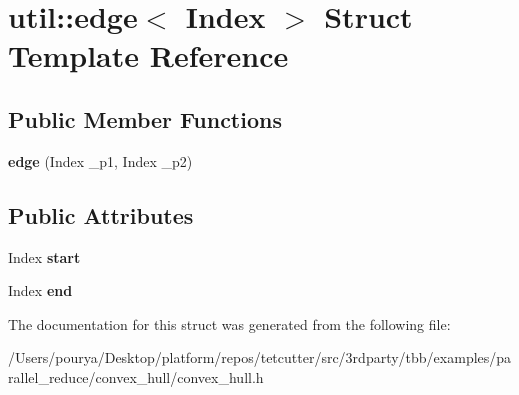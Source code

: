 \hypertarget{structutil_1_1edge}{}\section{util\+:\+:edge$<$ Index $>$ Struct Template Reference}
\label{structutil_1_1edge}
\subsection*{Public Member Functions}
\begin{DoxyCompactItemize}
\item 
\hypertarget{structutil_1_1edge_adda44d322aa2f8cf84fca30a4dc3a08e}{}{\bfseries edge} (Index \+\_\+p1, Index \+\_\+p2)\label{structutil_1_1edge_adda44d322aa2f8cf84fca30a4dc3a08e}

\end{DoxyCompactItemize}
\subsection*{Public Attributes}
\begin{DoxyCompactItemize}
\item 
\hypertarget{structutil_1_1edge_a16eddb9facb5669b55e4021ad0fd2f95}{}Index {\bfseries start}\label{structutil_1_1edge_a16eddb9facb5669b55e4021ad0fd2f95}

\item 
\hypertarget{structutil_1_1edge_afa367e9cc596c9f0277f57cc7dd103cd}{}Index {\bfseries end}\label{structutil_1_1edge_afa367e9cc596c9f0277f57cc7dd103cd}

\end{DoxyCompactItemize}


The documentation for this struct was generated from the following file\+:\begin{DoxyCompactItemize}
\item 
/\+Users/pourya/\+Desktop/platform/repos/tetcutter/src/3rdparty/tbb/examples/parallel\+\_\+reduce/convex\+\_\+hull/convex\+\_\+hull.\+h\end{DoxyCompactItemize}

